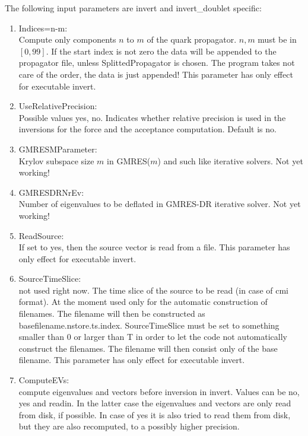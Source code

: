 The following input parameters are {\ttfamily invert} and {\ttfamily
  invert\_doublet} specific:
\begin{enumerate}
\item {\ttfamily Indices=n-m}:\\
  Compute only components $n$ to $m$ of the quark propagator. $n,m$ must
  be in $[0,99]$. If the start index is not zero the data will be
  appended to the propagator file, unless {\ttfamily
    SplittedPropagator} is chosen. The program takes not care of the
  order, the data is just appended! This parameter has only
  effect for executable {\ttfamily invert}.

\item {\ttfamily UseRelativePrecision}:\\
  Possible values {\ttfamily yes, no}. Indicates whether relative
  precision is used in the inversions for the force and the acceptance
  computation. Default is no.
  
\item {\ttfamily GMRESMParameter}:\\
  Krylov subspace size $m$ in GMRES($m$) and such like iterative
  solvers. Not yet working!

\item {\ttfamily GMRESDRNrEv}:\\
  Number of eigenvalues to be deflated in GMRES-DR iterative
  solver. Not yet working!

\item {\ttfamily ReadSource}:\\
  If set to yes, then the source vector is read from a file. This
  parameter has only effect for executable {\ttfamily invert}.

\item {\ttfamily SourceTimeSlice}:\\
  not used right now.
  The time slice of the source to be read (in case of cmi format). At
  the moment used only for
  the automatic construction of filenames. The filename will then be
  constructed as {\ttfamily basefilename.nstore.ts.index}.
  {\ttfamily SourceTimeSlice} must be set to something
  smaller than 0 or larger than T in order to let the code not
  automatically construct the filenames. The filename will then
  consist only of the base filename. This parameter has only
  effect for executable {\ttfamily invert}.

\item {\ttfamily ComputeEVs}:\\
  compute eigenvalues and vectors before inversion in invert. Values
  can be no, yes and readin. In the latter case the eigenvalues and
  vectors are only read from disk, if possible. In case of yes it is
  also tried to read them from disk, but they are also recomputed, to
  a possibly higher precision.


\end{enumerate}
